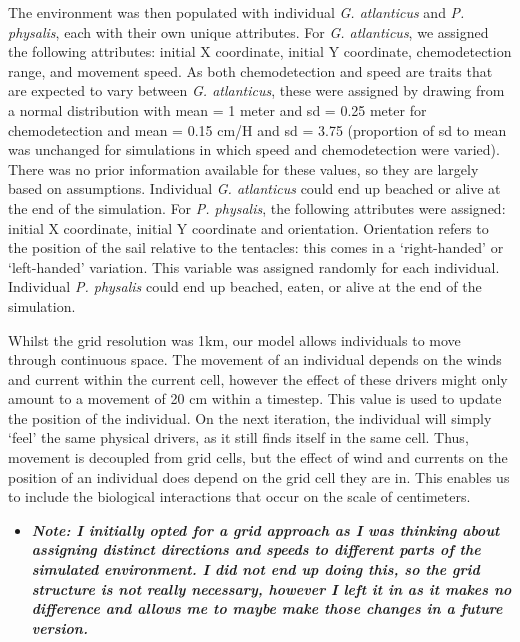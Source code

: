\documentclass[
]{article}
\providecommand{\tightlist}{%
  \setlength{\itemsep}{0pt}\setlength{\parskip}{0pt}}
\begin{document}
The environment was then populated with individual \emph{G. atlanticus}
and \emph{P. physalis}, each with their own unique attributes. For
\emph{G. atlanticus}, we assigned the following attributes: initial X
coordinate, initial Y coordinate, chemodetection range, and movement
speed. As both chemodetection and speed are traits that are expected to
vary between \emph{G. atlanticus}, these were assigned by drawing from a
normal distribution with mean = 1 meter and sd = 0.25 meter for
chemodetection and mean = 0.15 cm/H and sd = 3.75 (proportion of sd to
mean was unchanged for simulations in which speed and chemodetection
were varied). There was no prior information available for these values,
so they are largely based on assumptions. Individual \emph{G.
atlanticus} could end up beached or alive at the end of the simulation.
For \emph{P. physalis}, the following attributes were assigned: initial
X coordinate, initial Y coordinate and orientation. Orientation refers
to the position of the sail relative to the tentacles: this comes in a
`right-handed' or `left-handed' variation. This variable was assigned
randomly for each individual. Individual \emph{P. physalis} could end up
beached, eaten, or alive at the end of the simulation.

Whilst the grid resolution was 1km, our model allows individuals to move
through continuous space. The movement of an individual depends on the
winds and current within the current cell, however the effect of these
drivers might only amount to a movement of 20 cm within a timestep. This
value is used to update the position of the individual. On the next
iteration, the individual will simply `feel' the same physical drivers,
as it still finds itself in the same cell. Thus, movement is decoupled
from grid cells, but the effect of wind and currents on the position of
an individual does depend on the grid cell they are in. This enables us
to include the biological interactions that occur on the scale of
centimeters.

\begin{itemize}
\tightlist
\item
  \textbf{\emph{Note: I initially opted for a grid approach as I was
  thinking about assigning distinct directions and speeds to different
  parts of the simulated environment. I did not end up doing this, so
  the grid structure is not really necessary, however I left it in as it
  makes no difference and allows me to maybe make those changes in a
  future version.}}
\end{itemize}
\end{document}
